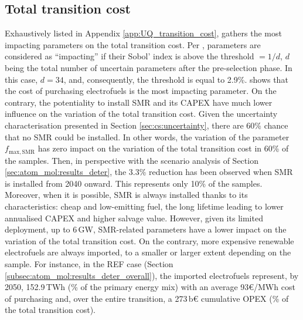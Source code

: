 \subsection{Total transition cost}
\label{subsec:atom_mol:results_uq_cost}
Exhaustively listed in Appendix \ref{app:UQ_transition_cost},  gathers the most impacting parameters on the total transition cost. Per \citet{Turati2017}, parameters are considered as ``impacting'' if their Sobol' index is above the threshold $=1/d$, $d$ being the total number of uncertain parameters after the pre-selection phase. In this case, $d=34$, and, consequently, the threshold is equal to 2.9\%.  shows that the cost of purchasing electrofuels is the most impacting parameter. On the contrary, the potentiality to install \gls{SMR} and its CAPEX have much lower influence on the variation of the total transition cost. Given the uncertainty characterisation presented in Section \ref{sec:cs:uncertainty}, there are 60\% chance that no \gls{SMR} could be installed. In other words, the variation of the parameter $f_{\mathrm{max,SMR}}$ has zero impact on the variation of the total transition cost in 60\% of the samples. Then, in perspective with the scenario analysis of Section \ref{sec:atom_mol:results_deter}, the 3.3\% reduction has been observed when \gls{SMR} is installed from 2040 onward. This represents only 10\% of the samples. Moreover, when it is possible, \gls{SMR} is always installed thanks to its characteristics: cheap and low-emitting fuel, the long lifetime leading to lower annualised CAPEX and higher salvage value. However, given its limited deployment, up to 6\,GW, \gls{SMR}-related parameters have a lower impact on the variation of the total transition cost. On the contrary, more expensive renewable electrofuels are always imported, to a smaller or larger extent depending on the sample. For instance, in the REF case (Section \ref{subsec:atom_mol:results_deter_overall}), the imported electrofuels represent, by 2050, 152.9\,TWh (\% of the primary energy mix) with an average 93€/MWh cost of purchasing and, over the entire transition, a 273\,b€ cumulative OPEX (\% of the total transition cost).

